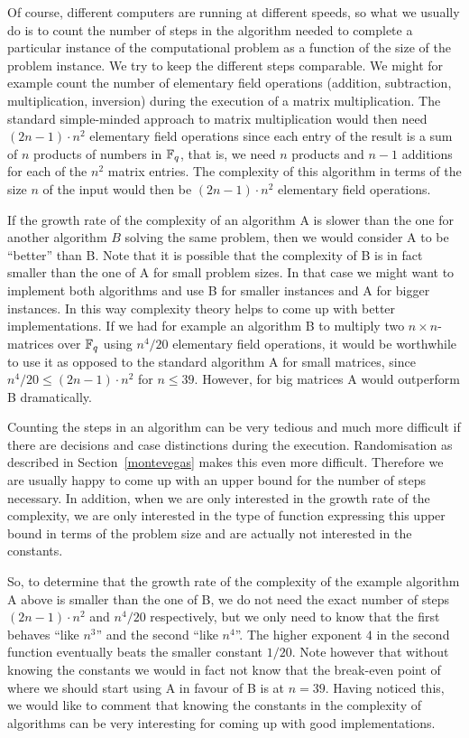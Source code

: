 Of course, different computers are running at different speeds, so
what we usually do is to count the number of steps in the algorithm
needed to complete a particular instance of the computational problem
as a function of the size of the problem instance.
We try to keep the different steps comparable. We might for example
count the number of elementary field operations (addition,
%
subtraction, multiplication, inversion) during the execution of a
matrix multiplication. The standard simple-minded approach to matrix
multiplication would then need $(2n-1)\cdot n^2$ elementary field
operations since each entry of the result is a sum of $n$ products of
numbers in $\mathbb{F}_q$, that is, we need $n$ products and $n-1$ additions
for each of the $n^2$ matrix entries. The complexity of this algorithm
in terms of the size $n$ of the input would then be $(2n-1)\cdot n^2$
elementary field operations.

If the growth rate of the complexity of an algorithm A is slower
%
than the one for another algorithm $B$ solving the same problem, then 
we would consider A to be ``better'' than B. Note that it is
possible that the complexity of B is in fact smaller than
the one of A for small problem sizes. In that case we might want to
implement both algorithms and use B for smaller instances and A for
bigger instances. In this way complexity theory helps to come up with
better implementations. If we had for example an algorithm B to multiply
two $n\times n$-matrices over $\mathbb{F}_q$ using $n^4/20$ elementary field
operations, it would be worthwhile to use it as opposed to the
standard algorithm A for small matrices, since
$n^4/20 \le (2n-1)\cdot n^2$ for $n \le 39$. However, for big
matrices A would outperform B dramatically.

Counting the steps in an algorithm can be very tedious and much more
difficult if there are decisions and case distinctions during the
execution. Randomisation as described in Section~\ref{montevegas}
makes this even more difficult. Therefore we are usually happy to come
up with an upper bound for the number of steps necessary. In addition,
when we are only interested in the growth rate of the complexity, we
%
are only interested in the type of function expressing this upper
bound in terms of the problem size and are actually not interested in
the constants. 

So, to determine that the growth rate of the complexity
%
of the example algorithm A above is smaller than the one of B, we do
not need the exact number of steps $(2n-1)\cdot n^2$ and $n^4/20$
respectively, but we only need to know that the first behaves ``like
$n^3$'' and the second ``like $n^4$''. The higher exponent $4$ in the
second function eventually beats the smaller constant $1/20$.
Note however that without knowing the constants we would in fact not
know that the break-even point of where we should start using A in
favour of B is at $n=39$. Having noticed this, we would like to comment
that knowing the constants in the complexity of algorithms can be very
interesting for coming up with good implementations.

